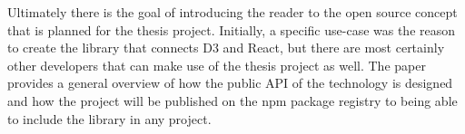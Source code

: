 Ultimately there is the goal of introducing the reader to the open source concept that is planned for the thesis project. Initially, a specific use-case was the reason to create the library that connects D3 and React, but there are most certainly other developers that can make use of the thesis project as well. The paper provides a general overview of how the public API of the technology is designed and how the project will be published on the npm package registry to being able to include the library in any project.
